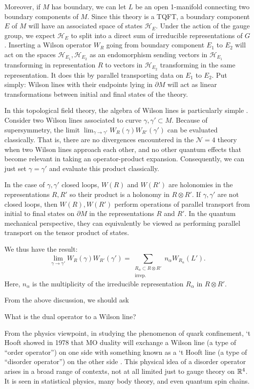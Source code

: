 	Moreover, if $M$ has boundary, we can let $L$ be an open 1-manifold connecting two boundary components of $M$. Since this theory is a TQFT, a boundary component $E$ of $M$ will have an associated space of states $\mathcal H_E$. Under the action of the gauge group, we expect $\mathcal H_E$ to split into a direct sum of irreducible representations of $G$. Inserting a Wilson operator $W_R$ going from boundary component $E_1$ to $E_2$ will act on the spaces $\mathcal H_{E_1}, \mathcal H_{E_2}$ as an endomorphism sending vectors in $\mathcal H_{E_1}$ transforming in representation $R$ to vectors in $\mathcal H_{E_2}$ transforming in the same representation. It does this by parallel transporting data on $E_1$ to $E_2$. Put simply: Wilson lines with their endpoints lying in $\partial M$ will act as linear transformations between initial and final states of the theory.
	
	In this topological field theory, the algebra of Wilson lines is particularly simple \cite{kapustin2006}. Consider two Wilson lines associated to curve $\gamma, \gamma' \subset M$. Because of supersymmetry, the limit $\lim_{\gamma \to \gamma'} W_R (\gamma) W_{R'} (\gamma')$ can be evaluated classically. That is, there are no divergences encountered in the $\mathcal N=4$ theory when two Wilson lines approach each other, and no other quantum effects that become relevant in taking an operator-product expansion. Consequently, we can just set $\gamma= \gamma'$ and evaluate this product classically. 
	
	In the case of $\gamma, \gamma'$ closed loops, $W(R)$ and $W(R')$ are holonomies in the representations $R, R'$ so their product is a holonomy in $R \otimes R'$. If $\gamma, \gamma'$ are not closed loops, then $W(R), W(R')$ perform operations of parallel transport from initial to final states on $\partial M$ in the representations $R$ and $R'$. In the  quantum mechanical perspective, they can equivalently be viewed as performing parallel transport on the tensor product of states. 
	
	We thus have the result:
		\begin{equation}
			\lim_{\gamma \to \gamma'} W_R (\gamma) W_{R'} (\gamma') = \sum_{\substack{R_\alpha \subset R \otimes R' \\\text{irrep.}}} n_\alpha W_{R_\alpha}(L').
		\end{equation}
	Here, $n_\alpha$ is the multiplicity of the irreducible representation $R_{\alpha}$ in $R \otimes R'$.

	From the above discussion, we should ask 
	\begin{ques}
		What is the dual operator to a Wilson line?
	\end{ques}
	From the physics viewpoint, in studying the phenomenon of quark confinement, `t Hooft showed in 1978 that MO duality will exchange a Wilson line (a type of ``order operator'') on one side with something known as a `t Hooft line (a type of ``disorder operator'') on the other side \cite{hooft1978}. This physical idea of a disorder operator arises in a broad range of contexts, not at all limited just to gauge theory on $\mathbb{R}^4$. It is seen in statistical physics, many body theory, and even quantum spin chains.
	
